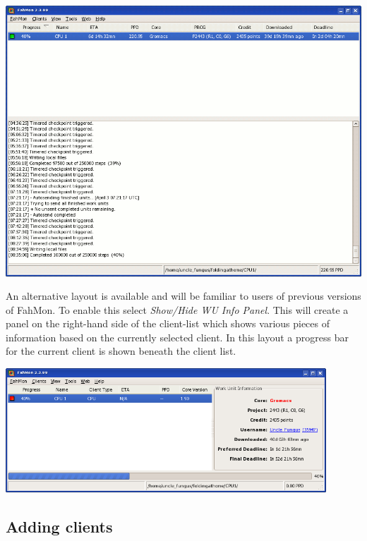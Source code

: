 \begin{center}
 \includegraphics[width=15cm]{3.png}
\end{center}

An alternative layout is available and will be familiar to users of previous
versions of FahMon. To enable this select \textit{Show/Hide WU Info Panel}. This
will create a panel on the right-hand side of the client-list which shows
various pieces of information based on the currently selected client. In this
layout a progress bar for the current client is shown beneath the client list.

\begin{center}
 \includegraphics[width=12cm]{4.png}
\end{center}




\subsection{Adding clients}

